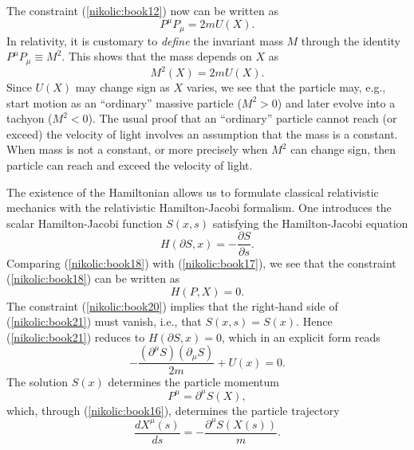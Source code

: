 \documentclass[12pt,twoside]{report} %
\begin{document}
The constraint (\ref{nikolic:book12}) now can be written as
\begin{equation}\label{nikolic:book18}
 P^{\mu}P_{\mu}=2mU(X) .
\end{equation}
In relativity, it is customary to {\em define} the invariant mass $M$ through
the identity $P^{\mu}P_{\mu}\equiv M^2$. This shows that the mass depends
on $X$ as
\begin{equation}\label{nikolic:book19}
 M^2(X)=2mU(X) .
\end{equation}
Since $U(X)$ may change sign as $X$ varies, we see that the particle may, e.g., 
start motion as an ``ordinary'' massive particle ($M^2>0$) and later evolve into a
tachyon ($M^2<0$). The usual proof that an ``ordinary'' particle cannot reach
(or exceed) the velocity of light involves an assumption that the mass is a constant.
When mass is not a constant, or more precisely when $M^2$ can change sign,
then particle can reach and exceed the velocity of light.
 
The existence of the Hamiltonian allows us to formulate classical relativistic mechanics
with the relativistic Hamilton-Jacobi formalism.
One introduces the scalar Hamilton-Jacobi function $S(x,s)$ satisfying the 
Hamilton-Jacobi equation
\begin{equation}\label{nikolic:book21}
H(\partial S,x)=-\frac{\partial S}{\partial s} .
\end{equation}
Comparing (\ref{nikolic:book18}) with (\ref{nikolic:book17}), we see that the constraint
(\ref{nikolic:book18}) can be written as
 \begin{equation}\label{nikolic:book20}
  H(P,X)=0 .
 \end{equation}
The constraint (\ref{nikolic:book20}) implies that the right-hand side of (\ref{nikolic:book21})
must vanish, i.e., that $S(x,s)=S(x)$.
Hence (\ref{nikolic:book21}) reduces to $H(\partial S,x)=0$, which
in an explicit form reads
\begin{equation}\label{nikolic:book22}
 -\frac{(\partial^{\mu}S) (\partial_{\mu}S)}{2m}+U(x) =0 .
\end{equation}
The solution $S(x)$ determines the particle momentum 
\begin{equation}\label{nikolic:book23}
 P^{\mu}=\partial^{\mu}S(X) ,
\end{equation}
which, through (\ref{nikolic:book16}), determines the particle trajectory
\begin{equation}\label{nikolic:book24}
 \frac{dX^{\mu}(s)}{ds}=-\frac{\partial^{\mu}S(X(s))}{m} .
\end{equation}
\end{document}
